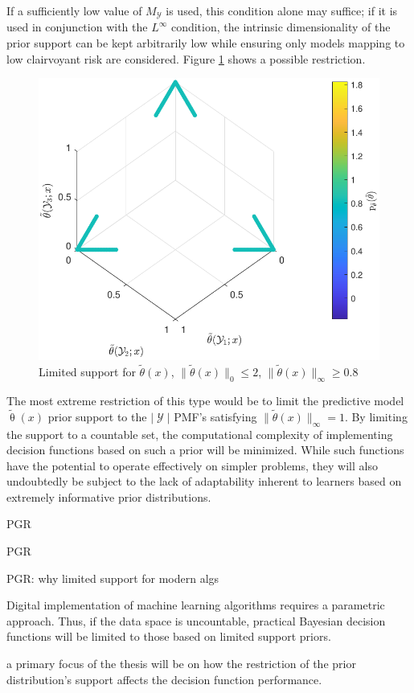 \documentclass[12pt]{article}
\DeclareMathOperator{\Ycal}{\mathcal{Y}}
\begin{document}
If a sufficiently low value of $M_{\Ycal}$ is used, this condition alone may suffice; if it is used in conjunction with the $L^{\infty}$ condition, the intrinsic dimensionality of the prior support can be kept arbitrarily low while ensuring only models mapping to low clairvoyant risk are considered. Figure \ref{fig:theta_tilde_L0-inf} shows a possible restriction.
\begin{figure}
\centering
\includegraphics[width=0.6\linewidth]{theta_tilde_L0-inf.pdf}
\caption{Limited support for $\tilde{\theta}(x)$, $\big\| \tilde{\theta}(x) \big\|_0 \leq 2$, $\big\| \tilde{\theta}(x) \big\|_{\infty} \geq 0.8$}
\label{fig:theta_tilde_L0-inf}
\end{figure}

The most extreme restriction of this type would be to limit the predictive model $\tilde{\uptheta}(x)$ prior support to the $|\Ycal|$ PMF's satisfying $\big\| \tilde{\theta}(x) \big\|_{\infty} = 1$. By limiting the support to a countable set, the computational complexity of implementing decision functions based on such a prior will be minimized. While such functions have the potential to operate effectively on simpler problems, they will also undoubtedly be subject to the lack of adaptability inherent to learners based on extremely informative prior distributions. 





PGR

PGR

PGR: why limited support for modern algs

Digital implementation of machine learning algorithms requires a parametric approach. Thus, if the data space is uncountable, practical Bayesian decision functions will be limited to those based on limited support priors.

a primary focus of the thesis will be on how the restriction of the prior distribution's support affects the decision function performance. 
\end{document}
